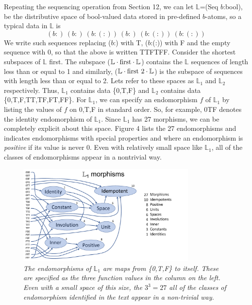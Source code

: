 \documentclass[11pt]{article}
\begin{document}
Repeating the sequencing operation from Section 12, we can let $\mathbb L$=(Seq $b$:bool), 
be the distributive space of bool-valued data stored in pre-defined $b$-atoms, so a typical data in $\mathbb L$ is 
\begin{equation}
(b:)\ (b:)\ (b:(:))\ (b:)\ (b:(:))\ (b:(:))
\end{equation}
We write such sequences replacing ($b$:) with T, ($b$:(:)) with F and the empty sequence with 0, so that the above is written TTFTFF.   
Consider the shortest subspaces of $\mathbb L$ first.  
The subspace (${\mathbb L}\cdot {\rm first}\cdot{\mathbb L}$) contains the $\mathbb L$ sequences of length less than or equal to 1 and similarly,  
(${\mathbb L}\cdot {\rm first\ 2}\cdot{\mathbb L}$) is the subspace of sequences with length less than or equal to 2.  Lets refer to these spaces as 
${\mathbb L}_1$ and ${\mathbb L}_2$ respectively.  
Thus, ${\mathbb L}_1$ contains data \{0,T,F\} and ${\mathbb L}_2$ contains data \{0,T,F,TT,TF,FT,FF\}. 
For ${\mathbb L}_1$, we can specify an endomorphism $f$ of ${\mathbb L}_1$ by listing the values of $f$ on 0,T,F in standard order.  So, for example, 
0TF denotes the identity endomorphism of ${\mathbb L}_1$.  
Since ${\mathbb L}_1$ has 27 morphisms, we can be completely explicit about this space.  
Figure 4 lists the 27 endomorphisms and indicates endomorphisms with special properties and where an endomorphism is {\it positive} if its value is never 0.  
Even with relatively small space like ${\mathbb L}_1$, all of 
the classes of endomorphisms appear in a nontrivial way.

\begin{figure}[h]
\centering
\includegraphics[width=0.8\textwidth]{L1.pdf}
\caption{{\it The endomorphisms of ${\mathbb L}_1$ are maps from \{0,T,F\} to itself. These are specified as the three function 
values in the column on the left.  Even with a small space of this size, the $3^3=27$ all of the classes of endomorphism identified in the text 
appear in a non-trivial way.}}
\end{figure}
\end{document}
